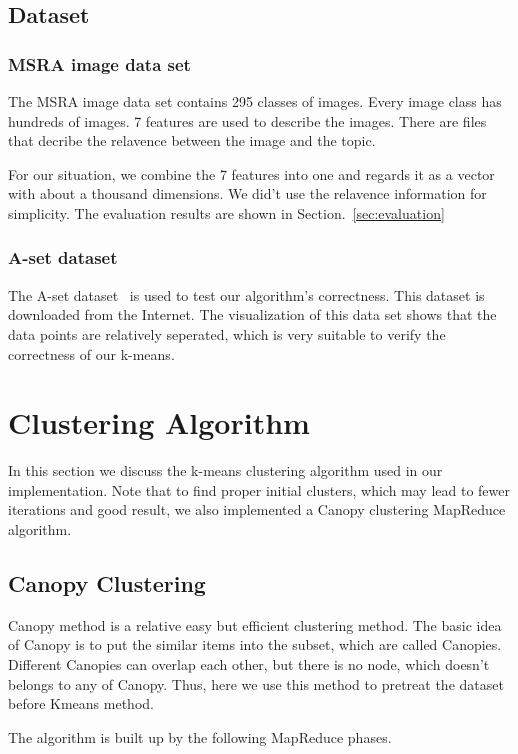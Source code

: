 \documentclass[a4paper,11pt]{article}
\begin{document}
\subsection{Dataset}
\subsubsection{MSRA image data set}
The MSRA image data set contains 295 classes of images. Every image class
has hundreds of images. 7 features are used to describe the images. There are
files that decribe the relavence between the image and the topic.

For our situation, we combine the 7 features into one and regards it as a vector
with about a thousand dimensions. We did't use the relavence information for
simplicity. The evaluation results are shown in Section.~\ref{sec:evaluation}
\subsubsection{A-set dataset}
The A-set dataset~\cite{dataset:aset} is used to test our algorithm's
correctness. This dataset is downloaded from the Internet. The visualization of
this data set shows that the data points are relatively seperated, which is very
suitable to verify the correctness of our k-means.

\section{Clustering Algorithm}
In this section we discuss the k-means clustering algorithm used in our
implementation. Note that to find proper initial clusters, which may lead to
fewer iterations and good result, we also implemented a Canopy clustering
MapReduce algorithm.
\subsection{Canopy Clustering}
Canopy method is a relative easy but efficient clustering method. The basic 
idea of Canopy is to put the similar items into the subset, which are called 
Canopies. Different Canopies can overlap each other, but there is no node, 
which doesn't belongs to any of Canopy. Thus, here we use this method to 
pretreat the dataset before Kmeans method. 

The algorithm is built up by the following MapReduce phases.
\end{document}
